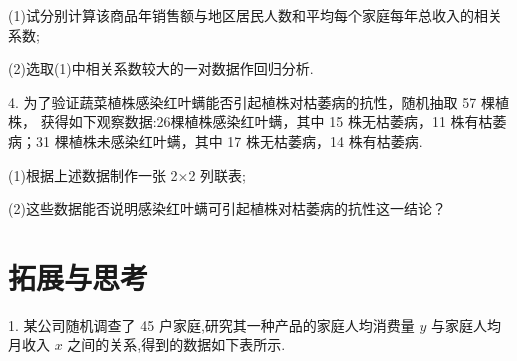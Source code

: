 \documentclass[10pt]{article}
\begin{document}
(1)试分别计算该商品年销售额与地区居民人数和平均每个家庭每年总收入的相关系数;

(2)选取(1)中相关系数较大的一对数据作回归分析.

4. 为了验证蔬菜植株感染红叶螨能否引起植株对枯萎病的抗性，随机抽取 57 棵植株， 获得如下观察数据:26棵植株感染红叶螨，其中 15 株无枯萎病，11 株有枯萎病；31 棵植株未感染红叶螨，其中 17 株无枯萎病，14 株有枯萎病.

(1)根据上述数据制作一张 2×2 列联表;

(2)这些数据能否说明感染红叶螨可引起植株对枯萎病的抗性这一结论？

\section*{}

\section*{}

\section*{拓展与思考}

1. 某公司随机调查了 45 户家庭,研究其一种产品的家庭人均消费量 \(y\) 与家庭人均月收入 \(x\) 之间的关系,得到的数据如下表所示.
\end{document}
